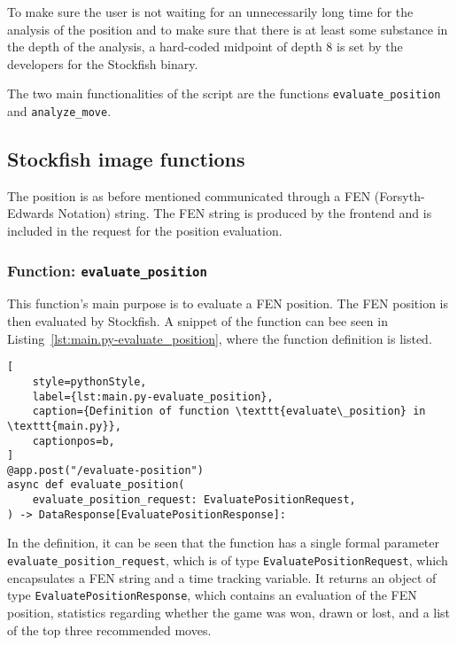 To make sure the user is not waiting for an unnecessarily long time for the analysis of the position and to make sure
that there is at least some substance in the depth of the analysis, a hard-coded midpoint of depth 8 is set by the
developers for the Stockfish binary.

The two main functionalities of the script are the functions \texttt{evaluate\_position} and \texttt{analyze\_move}.

\subsection{Stockfish image functions}\label{subsec:stockfish-image-functions}

The position is as before mentioned communicated through a FEN (Forsyth-Edwards Notation) string.
The FEN string is produced by the frontend and is included in the request for the position evaluation.

\subsubsection{Function: \texttt{evaluate\_position}}\label{subsubsec:function:evaluate_position}

This function's main purpose is to evaluate a FEN position.
The FEN position is then evaluated by Stockfish.
A snippet of the function can bee seen in Listing~\ref{lst:main.py-evaluate_position}, where the function definition is
listed.

\begin{lstlisting}[
    style=pythonStyle,
    label={lst:main.py-evaluate_position},
    caption={Definition of function \texttt{evaluate\_position} in \texttt{main.py}},
    captionpos=b,
]
@app.post("/evaluate-position")
async def evaluate_position(
    evaluate_position_request: EvaluatePositionRequest,
) -> DataResponse[EvaluatePositionResponse]:
\end{lstlisting}

In the definition, it can be seen that the function has a single formal parameter \texttt{evaluate\_position\_request},
which is of type \texttt{EvaluatePositionRequest}, which encapsulates a FEN string and a time tracking variable.
It returns an object of type \texttt{EvaluatePositionResponse}, which contains an evaluation of the FEN position,
statistics regarding whether the game was won, drawn or lost, and a list of the top three recommended moves.

